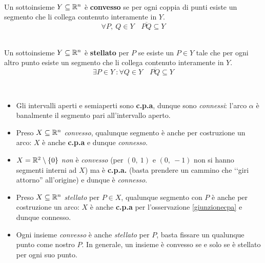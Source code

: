 \begin{define}~{}\\
	Un sottoinsieme $Y\subseteq\mathbb{R}^n$ è \textbf{convesso} se per ogni coppia di punti esiste un segmento che li collega contenuto interamente in $Y$.
	\begin{equation}
		\forall P,\ Q\in Y\quad \overline{PQ}\subseteq Y
	\end{equation}
\vspace{-6mm}
\end{define}
\begin{define}~{}\\
	Un sottoinsieme $Y\subseteq\mathbb{R}^n$ è \textbf{stellato} per $P$ se esiste un $P\in Y$ tale che per ogni altro punto esiste un segmento che li collega contenuto interamente in $Y$.
	\begin{equation}
		\exists P \in Y\ \colon \forall Q\in Y\quad \overline{PQ}\subseteq Y
	\end{equation}
\vspace{-6mm}
\end{define}
\begin{examples}~{}
\begin{itemize}
	\item Gli intervalli aperti e semiaperti sono \textbf{c.p.a}, dunque sono \textit{connessi}: l'arco $\alpha$ è banalmente il segmento pari all'intervallo aperto.
	\item Preso $X\subseteq\mathbb{R}^n$ \textit{convesso}, qualunque segmento è anche per costruzione un arco: $X$ è anche \textbf{c.p.a} e dunque \textit{connesso}.
	\item $X=\mathbb{R}^{2}\setminus\left\{0\right\}$ \textit{non} è \textit{convesso} (per $\left(0,\ 1\right)$ e $\left(0,\ -1\right)$ non si hanno segmenti interni ad $X$) ma è \textbf{c.p.a.} (basta prendere un cammino che ‘‘giri attorno'' all'origine) e dunque è \textit{connesso}.
	\item Preso $X\subseteq\mathbb{R}^n$ \textit{stellato} per $P\in X$, qualunque segmento con $P$ è anche per costruzione un arco: $X$ è anche \textbf{c.p.a} per l'osservazione \ref{giunzionecpa} e dunque {connesso}.
	\item Ogni insieme \textit{convesso} è anche \textit{stellato} per $P$, basta fissare un qualunque punto come nostro $P$. In generale, un insieme è convesso se e solo se è stellato per ogni suo punto.
\end{itemize}
\vspace{-3mm}
\end{examples}
